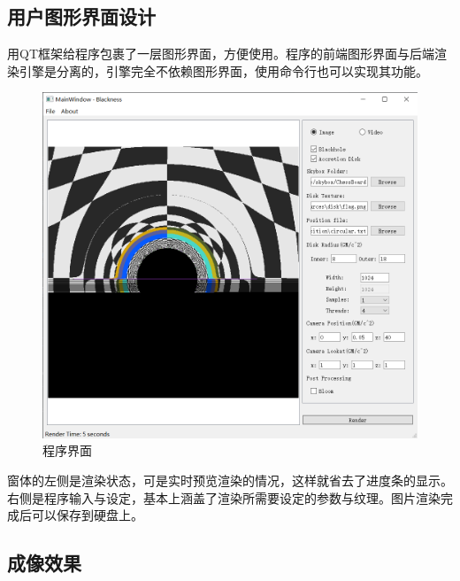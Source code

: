 \subsection{用户图形界面设计}
用QT框架给程序包裹了一层图形界面，方便使用。程序的前端图形界面与后端渲染引擎是分离的，引擎完全不依赖图形界面，使用命令行也可以实现其功能。
\begin{figure}[H]
    \centering
    \includegraphics[scale=0.5]{images/gui.png}
    \caption{程序界面}
    \label{fig:gui} %
\end{figure}
窗体的左侧是渲染状态，可是实时预览渲染的情况，这样就省去了进度条的显示。右侧是程序输入与设定，基本上涵盖了渲染所需要设定的参数与纹理。图片渲染完成后可以保存到硬盘上。


\subsection{成像效果}

